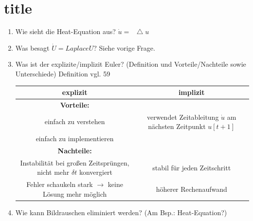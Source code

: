 \documentclass[10pt,a4paper,titlepage]{article}
\begin{document}
\section{title}
\begin{enumerate}[resume=b]
	\item Wie sieht die Heat-Equation aus?
	\textbf{$ \dot{u}=\mathop{}\!\mathbin\bigtriangleup u$}
	\item Was besagt $\dot{U} = Laplace U$?
		Siehe vorige Frage.
	\item Was ist der explizite/implizit Euler? (Definition und Vorteile/Nachteile sowie Unterschiede)\newline
	Definition vgl. 59\\
	\begin{tabular}{c|c}
		explizit & implizit\\\hline
		\textbf{Vorteile:}&\\
		einfach zu verstehen& verwendet Zeitableitung $\dot{u}$ am nächsten Zeitpunkt $u[t+1]$\\
		einfach zu implementieren &\\
		\textbf{Nachteile:}& \\
		Instabilität bei großen Zeitsprüngen, nicht mehr $\delta t$ konvergiert & stabil für jeden Zeitschritt \\
		Fehler schaukeln stark $\rightarrow$ keine Lösung mehr möglich & höherer Rechenaufwand
	\end{tabular} 
	\item Wie kann Bildrauschen eliminiert werden? (Am Bsp.: Heat-Equation?) \newline
	

\end{enumerate}
\end{document}
